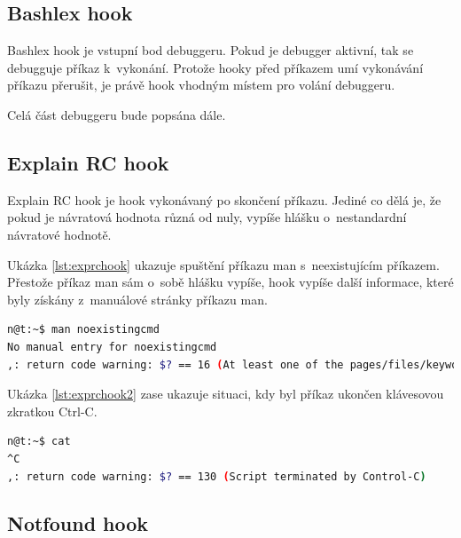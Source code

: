 \documentclass[thesis=M,czech]{FITthesis}[2012/06/26]
\begin{document}

\subsection{Bashlex hook}

Bashlex hook je vstupní bod debuggeru. Pokud je debugger aktivní, tak se debugguje příkaz k~vykonání. Protože hooky před příkazem umí vykonávání příkazu přerušit, je právě hook vhodným místem pro volání debuggeru.

Celá část debuggeru bude popsána dále.

\subsection{Explain RC hook}

Explain RC hook je hook vykonávaný po skončení příkazu. Jediné co dělá je, že pokud je návratová hodnota různá od nuly, vypíše hlášku o~nestandardní návratové hodnotě.

Ukázka \ref{lst:exprchook} ukazuje spuštění příkazu man s~neexistujícím příkazem. Přestože příkaz man sám o~sobě hlášku vypíše, hook vypíše další informace, které byly získány z~manuálové stránky příkazu man.

\begin{minipage}{\linewidth}
\begin{lstlisting}[language=bash, caption={Explain RC hook}, label={lst:exprchook}]
n@t:~$ man noexistingcmd
No manual entry for noexistingcmd
,: return code warning: $? == 16 (At least one of the pages/files/keywords didn't exist or wasn't matched.)
\end{lstlisting}
\end{minipage}

Ukázka \ref{lst:exprchook2} zase ukazuje situaci, kdy byl příkaz ukončen klávesovou zkratkou Ctrl-C.

\begin{minipage}{\linewidth}
\begin{lstlisting}[language=bash, caption={Explain RC hook}, label={lst:exprchook2}]
n@t:~$ cat
^C
,: return code warning: $? == 130 (Script terminated by Control-C)
\end{lstlisting}
\end{minipage}


\subsection{Notfound hook}
\end{document}
